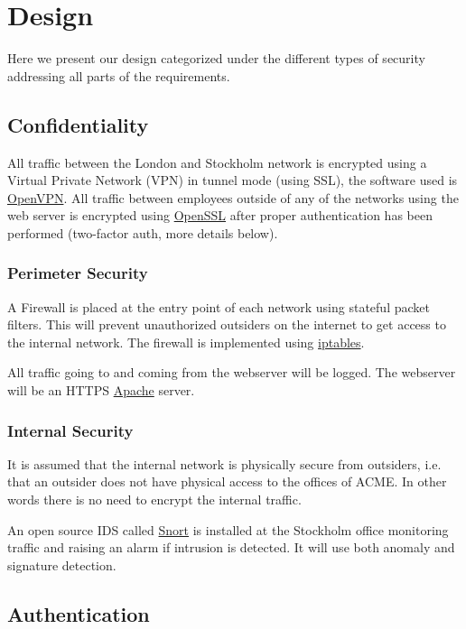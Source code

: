 \section*{Design}

Here we present our design categorized under the different types of security addressing all parts of the requirements.

\subsection*{Confidentiality}

All traffic between the London and Stockholm network is encrypted using a Virtual Private Network (VPN) in tunnel mode (using SSL), the software used is \href{http://openvpn.net/}{OpenVPN}. All traffic between employees outside of any of the networks using the web server is encrypted using \href{http://www.openssl.org/}{OpenSSL} after proper authentication has been performed (two-factor auth, more details below).

\subsubsection*{Perimeter Security}

A Firewall is placed at the entry point of each network using stateful packet filters. This will prevent unauthorized outsiders on the internet to get access to the internal network. The firewall is implemented using \href{http://en.wikipedia.org/wiki/Iptables}{iptables}.

All traffic going to and coming from the webserver will be logged. The webserver will be an HTTPS \href{http://httpd.apache.org/}{Apache} server.

\subsubsection*{Internal Security}

It is assumed that the internal network is physically secure from outsiders, i.e. that an outsider does not have physical access to the offices of ACME. In other words there is no need to encrypt the internal traffic.

An open source IDS called \href{https://www.snort.org/}{Snort} is installed at the Stockholm office monitoring traffic and raising an alarm if intrusion is detected. It will use both anomaly and signature detection.

\subsection*{Authentication}

